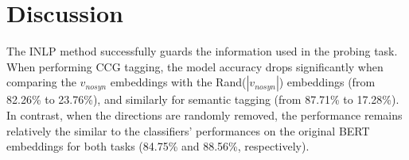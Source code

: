 \documentclass[11pt,a4paper]{article}
\begin{document}



\section{Discussion}
\label{sec:discussion}
The INLP method successfully guards the information used in the probing task. When performing CCG tagging, the model accuracy drops significantly when comparing the $v_{nosyn}$ embeddings with the Rand($|v_{nosyn}|$) embeddings (from 82.26\% to 23.76\%), and similarly for semantic tagging (from 87.71\% to 17.28\%). In contrast, when the directions are randomly removed, the performance remains relatively the similar to the classifiers' performances on the original BERT embeddings for both tasks (84.75\% and 88.56\%, respectively).

\end{document}
